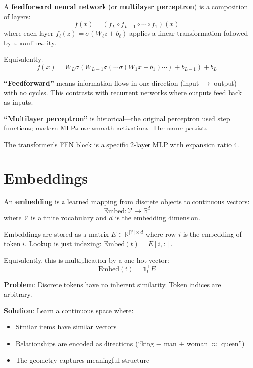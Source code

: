 \begin{definition}
    A \textbf{feedforward neural network} (or \textbf{multilayer perceptron}) is a composition of layers:
    \[
        f(x) = (f_L \circ f_{L-1} \circ \cdots \circ f_1)(x)
    \]
    where each layer $f_\ell(z) = \sigma(W_\ell z + b_\ell)$ applies a linear transformation followed by a nonlinearity.

    Equivalently:
    \[
        f(x) = W_L \sigma(W_{L-1} \sigma(\cdots \sigma(W_1 x + b_1) \cdots) + b_{L-1}) + b_L
    \]
\end{definition}

\begin{remark}[Terminology]
    \textbf{``Feedforward''} means information flows in one direction (input $\to$ output) with no cycles. This contrasts with recurrent networks where outputs feed back as inputs.

    \textbf{``Multilayer perceptron''} is historical---the original perceptron used step functions; modern MLPs use smooth activations. The name persists.

    The transformer's FFN block is a specific 2-layer MLP with expansion ratio 4.
\end{remark}

\section{Embeddings}

\begin{definition}[Embedding]
    An \textbf{embedding} is a learned mapping from discrete objects to continuous vectors:
    \[
        \text{Embed}: \mathcal{V} \to \mathbb{R}^d
    \]
    where $\mathcal{V}$ is a finite vocabulary and $d$ is the embedding dimension.
\end{definition}

\begin{remark}[Implementation]
    Embeddings are stored as a matrix $E \in \mathbb{R}^{|\mathcal{V}| \times d}$ where row $i$ is the embedding of token $i$. Lookup is just indexing: $\text{Embed}(t) = E[i, :]$.

    Equivalently, this is multiplication by a one-hot vector:
    \[
        \text{Embed}(t) = \mathbf{1}_t^\top E
    \]
\end{remark}

\begin{remark}
    \textbf{Problem}: Discrete tokens have no inherent similarity. Token indices are arbitrary.

    \textbf{Solution}: Learn a continuous space where:
    \begin{itemize}
        \item Similar items have similar vectors
        \item Relationships are encoded as directions (``king $-$ man $+$ woman $\approx$ queen'')
        \item The geometry captures meaningful structure
    \end{itemize}
\end{remark}

